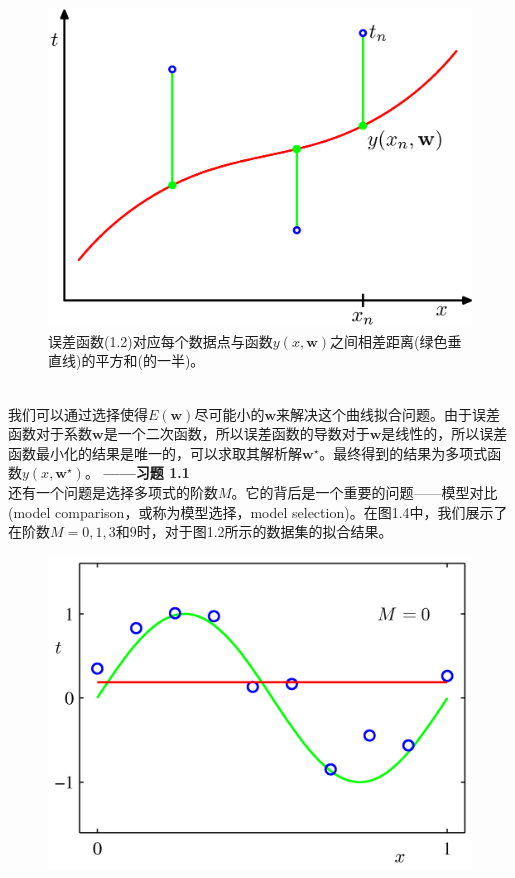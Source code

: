 \documentclass[b5paper]{book}
\numberwithin{equation}{chapter}
\begin{document}
{\begin{figure}[ht]
		\includegraphics[scale=0.8]{Images/1-3.png}
		\caption{误差函数(1.2)对应每个数据点与函数$y(x, \mathbf{w})$之间相差距离(绿色垂直线)的平方和(的一半)。} 
		\label{fig:1-3}	
	\end{figure}
	\\
	\indent 我们可以通过选择使得$E(\mathbf{w})$尽可能小的$\mathbf{w}$来解决这个曲线拟合问题。由于误差函数对于系数$\mathbf{w}$是一个二次函数，所以误差函数的导数对于$\mathbf{w}$是线性的，所以误差函数最小化的结果是唯一的，可以求取其解析解$\mathbf{w^\star}$。最终得到的结果为多项式函数$y(x,\mathbf{w^\star})$。\color{red} \textbf{——习题 1.1}\\
	\color{black}
	\indent 还有一个问题是选择多项式的阶数$M$。它的背后是一个重要的问题——模型对比(model comparison，或称为模型选择，model selection)。在图1.4中，我们展示了在阶数$M=0,1,3$和$9$时，对于图1.2所示的数据集的拟合结果。
	\begin{figure}[ht]
		\begin{minipage}[t]{0.5\linewidth}
		\includegraphics[scale=0.8]{Images/1-4a.png}

\end{minipage}
\end{figure}}
\end{document}
